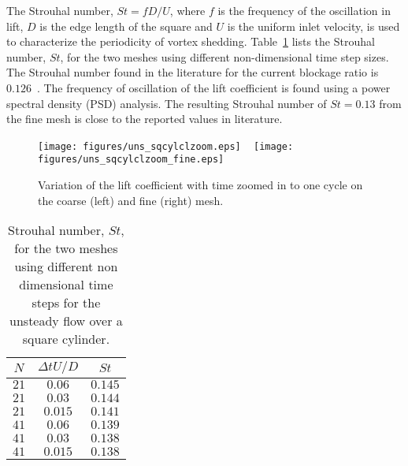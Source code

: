 The Strouhal number, $St = fD/U$, where $f$ is the frequency of the oscillation in lift, $D$ is the edge length of the square and $U$ is the uniform inlet velocity, is used to characterize the periodicity of vortex shedding. Table~\ref{tab:unssqcyl} lists the Strouhal number, $St$, for the two meshes using different non-dimensional time step sizes. The Strouhal number found in the literature for the current blockage ratio is $0.126$~\cite{kelkar1992numerical}. The frequency of oscillation of the lift coefficient is found using a power spectral density (PSD) analysis. The resulting Strouhal number of $St=0.13$ from the fine mesh is close to the reported values in literature.
\begin{figure}[h!]
    \centering
        \texttt{[image: figures/uns\_sqcylclzoom.eps]}
    ~ %
        \texttt{[image: figures/uns\_sqcylclzoom\_fine.eps]}
        
    \caption{Variation of the lift coefficient with time zoomed in to one cycle on the coarse (left) and fine (right) mesh.}
    \label{fig:unssqcylfine}
\end{figure}
\begin{table}[h!]
\centering
\captionsetup{justification=centering}
\begin{tabular}{ |c|c|c| } 
\hline
 $N$ & $\Delta t U/D$ &  $St$\\
\hline
$21$& $0.06$& $0.145$ \\
\hline
$21$& $0.03$& $0.144$ \\
\hline
$21$& $0.015$& $0.141$ \\
\hline
$41$ & $0.06$ & $0.139$ \\
\hline
$41$ & $0.03$ & $0.138$ \\
\hline
$41$ & $0.015$ &$0.138$\\
\hline
\end{tabular}
\caption{Strouhal number, $St$, for the two meshes using different non dimensional time steps for the unsteady flow over a square cylinder.}
\label{tab:unssqcyl}
\end{table}
